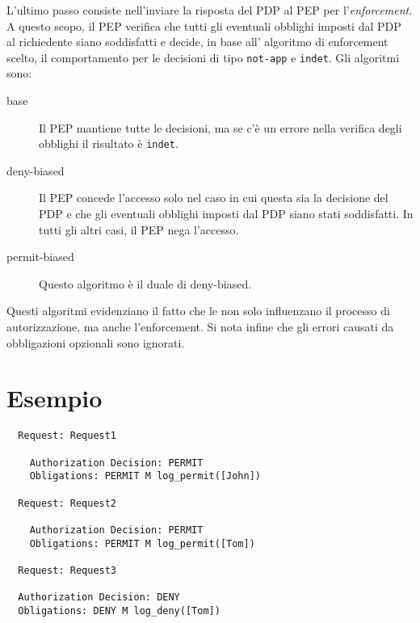 L'ultimo passo consiste nell'inviare la risposta del PDP al PEP per l'\emph{enforcement}. A questo scopo, il PEP verifica
che tutti gli eventuali obblighi imposti dal PDP al richiedente siano soddisfatti e decide, in base all' algoritmo di
enforcement scelto, il comportamento per le decisioni di tipo \texttt{not-app} e \texttt{indet}. Gli algoritmi sono:
\begin{description}
  \item[base]Il PEP mantiene tutte le decisioni, ma se c'è un errore nella verifica degli obblighi il risultato è \texttt{indet}.
  \item[deny-biased]Il PEP concede l'accesso solo nel caso in cui questa sia la decisione del PDP e che gli eventuali obblighi imposti dal PDP siano stati soddisfatti. In tutti gli altri casi, il PEP nega l’accesso.
  \item[permit-biased]Questo algoritmo è il duale di deny-biased.
\end{description}
Questi algoritmi evidenziano il fatto che le \eobligation non solo influenzano il processo di autorizzazione, ma anche l'enforcement.
Si nota infine che gli errori causati da obbligazioni opzionali sono ignorati.
\section{Esempio}
\label{sec:Esempio}


\begin{verbatim}
  Request: Request1

    Authorization Decision: PERMIT
    Obligations: PERMIT M log_permit([John])

  Request: Request2

    Authorization Decision: PERMIT
    Obligations: PERMIT M log_permit([Tom])

  Request: Request3

  Authorization Decision: DENY
  Obligations: DENY M log_deny([Tom])
\end{verbatim}

